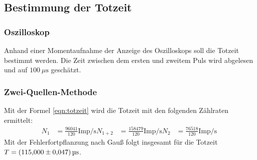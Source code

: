 \subsection{Bestimmung der Totzeit}
\label{subsec:Totzeit}

\subsubsection{Oszilloskop}
Anhand einer Momentaufnahme der Anzeige des Oszilloskops soll die Totzeit bestimmt werden.
Die Zeit zwischen dem ersten und zweitem Puls wird abgelesen und auf $\SI{100}{\mu\second}$ geschätzt.

\subsubsection{Zwei-Quellen-Methode}
Mit der Formel \eqref{eqn:totzeit} wird die Totzeit mit den folgenden Zählraten ermittelt:
\begin{align*}
  N_1 &= \frac{96041}{120} \text{Imp/s}
  N_{1+2} &= \frac{158479}{120} \text{Imp/s}
  N_2 &= \frac{76518}{120} \text{Imp/s}
\end{align*}
Mit der Fehlerfortpflanzung nach Gauß folgt insgesamt für die Totzeit $T = \SI{115 \pm 0.047}{\micro\second}$.
